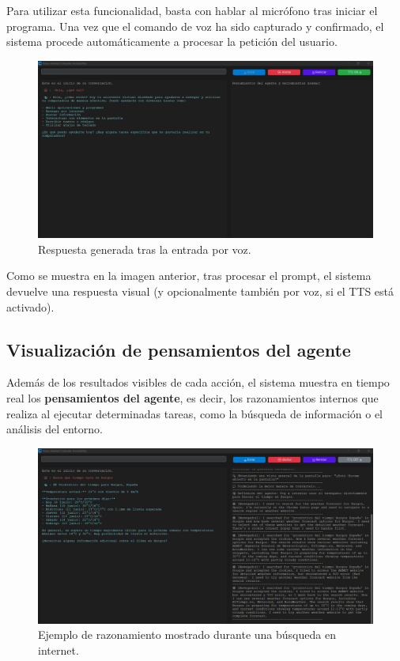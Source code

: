 Para utilizar esta funcionalidad, basta con hablar al micrófono tras iniciar el programa. Una vez que el comando de voz ha sido capturado y confirmado, el sistema procede automáticamente a procesar la petición del usuario.

\begin{figure}[h!]
\centering
\includegraphics[scale=0.35]{img/Output_voz.png}
\caption{Respuesta generada tras la entrada por voz.}
\label{fig:output_voz}
\end{figure}

Como se muestra en la imagen anterior, tras procesar el prompt, el sistema devuelve una respuesta visual (y opcionalmente también por voz, si el TTS está activado).

\subsection{Visualización de pensamientos del agente}

Además de los resultados visibles de cada acción, el sistema muestra en tiempo real los \textbf{pensamientos del agente}, es decir, los razonamientos internos que realiza al ejecutar determinadas tareas, como la búsqueda de información o el análisis del entorno.

\begin{figure}[h!]
\centering
\includegraphics[scale=0.35]{img/Output_search.png}
\caption{Ejemplo de razonamiento mostrado durante una búsqueda en internet.}
\label{fig:output_search}
\end{figure}

